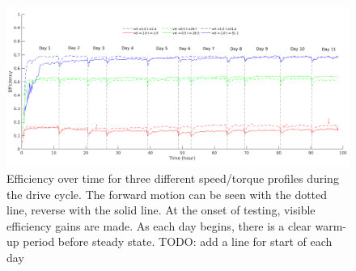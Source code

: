 \begin{figure}[t]
   \centering
   \includegraphics[width=\linewidth]{images/long_run_plot_v4}
   \caption{Efficiency over time for three different speed/torque profiles during the drive cycle.
   The forward motion can be seen with the dotted line, reverse with the solid line.
   At the onset of testing, visible efficiency gains are made.
   As each day begins, there is a clear warm-up period before steady state.
   TODO: add a line for start of each day}
   \label{long_run}
\end{figure}

